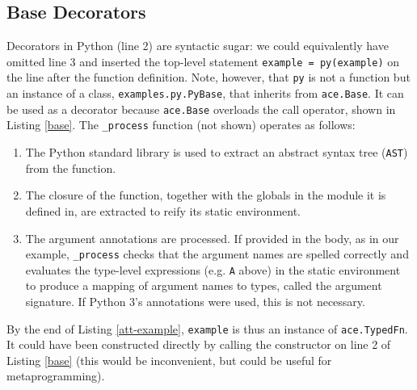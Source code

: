 {\subsection{Base Decorators}
Decorators in Python (line 2) are syntactic sugar: we could equivalently have omitted line 3 and inserted the top-level statement \verb|example = py(example)| on the line after the function definition. Note, however, that \verb|py| is not a function but an instance of a class, \verb|examples.py.PyBase|, that inherits from \verb|ace.Base|. It can be used as a decorator because \verb|ace.Base| overloads the call operator, shown in Listing \ref{base}. The \verb|_process| function (not shown) operates as follows:
\begin{enumerate}
\item The Python standard library is used to extract an abstract syntax tree (\verb|AST|) from the function.
\item The closure of the function, together with the globals in the module it is defined in, are extracted to reify its static environment.
\item The argument annotations are processed. If provided in the body, as in our example, \verb|_process| checks that the argument names are spelled correctly and evaluates the type-level expressions (e.g. \verb|A| above) in the static environment to produce a mapping of argument names to types, called the argument signature. If Python 3's annotations were used, this is not necessary.
\end{enumerate}
By the end of Listing \ref{att-example}, \verb|example| is thus an instance of \verb|ace.TypedFn|. It could  have been constructed directly by calling the constructor on line 2 of Listing \ref{base} (this would be inconvenient, but could be useful for metaprogramming). 

}
